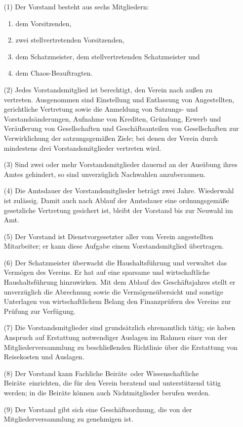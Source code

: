 \documentclass[12pt,paper=a4,ngerman]{scrreprt}
\begin{document}
\begin{itemize}
\item[(1)]
Der Vorstand besteht aus sechs Mitgliedern:
\begin{enumerate}
\item
dem Vorsitzenden,
\item
zwei stellvertretenden Vorsitzenden,
\item
dem Schatzmeister, dem stellvertretenden Schatzmeister und
\item
dem Chaos-Beauftragten.
\end{enumerate}
\item[(2)]
Jedes Vorstandsmitglied ist berechtigt, den Verein nach außen zu
vertreten. Ausgenommen sind Einstellung und Entlassung von
Angestellten, gerichtliche Vertretung sowie die Anmeldung von Satzungs- und Vorstandsänderungen, Aufnahme von
Krediten, Gründung, Erwerb und Veräußerung von Gesellschaften und
Geschäftsanteilen von Gesellschaften zur Verwirklichung der
satzungsgemäßen Ziele; bei denen der Verein durch mindestens drei
Vorstandsmitglieder vertreten wird.
\item[(3)]
Sind zwei oder mehr Vorstandsmitglieder dauernd an der Ausübung ihres
Amtes gehindert, so sind unverzüglich Nachwahlen anzuberaumen.
\item[(4)]
Die Amtsdauer der Vorstandsmitglieder beträgt zwei Jahre. Wiederwahl
ist zulässig. Damit auch nach Ablauf der Amtsdauer eine ordnungsgemäße
gesetzliche Vertretung gesichert ist, bleibt der Vorstand bis zur
Neuwahl im Amt.
\item[(5)]
Der Vorstand ist Dienstvorgesetzter aller vom Verein angestellten
Mitarbeiter; er kann diese Aufgabe einem Vorstandsmitglied
übertragen.
\item[(6)]
Der Schatzmeister überwacht die Haushaltsführung und verwaltet das
Vermögen des Vereins. Er hat auf eine sparsame und wirtschaftliche
Haushaltsführung hinzuwirken. Mit dem Ablauf des Geschäftsjahres
stellt er unverzüglich die Abrechnung sowie die Vermögensübersicht und
sonstige Unterlagen von wirtschaftlichem Belang den Finanzprüfern des
Vereins zur Prüfung zur Verfügung.
\item[(7)]
Die Vorstandsmitglieder sind grundsätzlich ehrenamtlich tätig; sie
haben Anspruch auf Erstattung notwendiger Auslagen im Rahmen einer von
der Mitgliederversammlung zu beschließenden Richtlinie über die
Erstattung von Reisekosten und Auslagen.
\item[(8)]
Der Vorstand kann \glqq Fachliche Beiräte\grqq\ oder \glqq
Wissenschaftliche Beiräte\grqq\ einrichten, die für den Verein
beratend und unterstützend tätig werden; in die Beiräte können auch
Nichtmitglieder berufen werden.
\item[(9)]
Der Vorstand gibt sich eine Geschäftsordnung, die von der
Mitgliederversammlung zu genehmigen ist.
\end{itemize}
\end{document}
